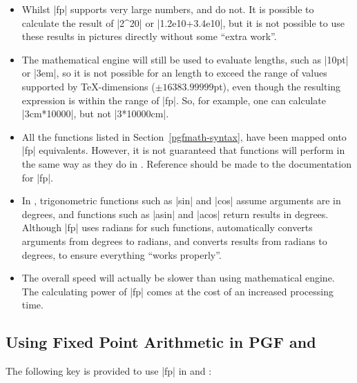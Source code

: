 \begin{itemize}
	
  \item 
  
  Whilst |fp| supports very large numbers, \pgfname{} and
  \tikzname{} do not. It is possible to calculate the result of 
  |2^20| or |1.2e10+3.4e10|, but it is not possible to use these
  results in pictures directly without some ``extra work''.
  
  \item
  
  The \pgfname{} mathematical engine will still be used to evaluate
  lengths, such as |10pt| or |3em|, so it is not possible for an
  length to exceed the range of values supported by 
  \TeX-dimensions ($\pm16383.99999$pt), even though the resulting 
  expression is within the range of |fp|. So, for example, one can
  calculate |3cm*10000|, but not |3*10000cm|.
  
  \item
  
  All the functions listed in Section~\ref{pgfmath-syntax}, have been
  mapped onto |fp| equivalents. However, it is not guaranteed that
  functions will perform in the same way as they do 
  in \pgfname. Reference should be made to the documentation for |fp|.
  
  \item
  
  In \pgfname, trigonometric functions such as |sin| and |cos| assume 
  arguments are in degrees, and functions such as |asin| and |acos|
  return results in degrees. Although |fp| uses radians for such
  functions, \pgfname{} automatically converts arguments from degrees 
  to radians, and converts results from radians to degrees, to ensure 
  everything ``works properly''.
   
  \item
  
  The overall speed will actually be slower than using 
  \pgfname{} mathematical engine. The calculating power of |fp| 
  comes at the cost of an increased processing time.
  
  
\end{itemize}
  
\subsection{Using Fixed Point Arithmetic in PGF and \tikzname}

  The following key is provided to use |fp| in \pgfname{} 
  and \tikzname:
  
